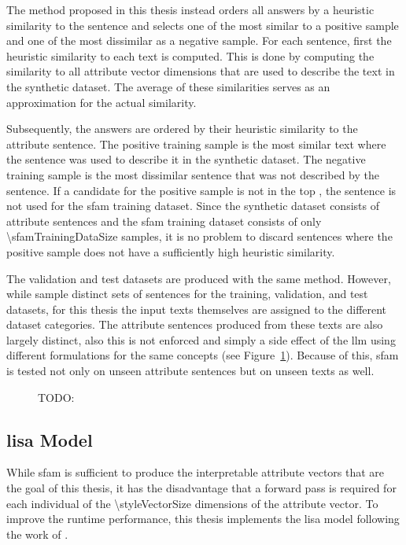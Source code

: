 The method proposed in this thesis instead orders all answers by a heuristic similarity to the sentence and selects one of the most similar to a positive sample and one of the most dissimilar as a negative sample. For each sentence, first the heuristic similarity to each text is computed. This is done by computing the similarity to all attribute vector dimensions that are used to describe the text in the synthetic dataset. The average of these similarities serves as an approximation for the actual similarity.

Subsequently, the answers are ordered by their heuristic similarity to the attribute sentence. The positive training sample is the most similar text where the sentence was used to describe it in the synthetic dataset. The negative training sample is the most dissimilar sentence that was not described by the sentence. If a candidate for the positive sample is not in the top \sfamDataTopPercentText{}, the sentence is not used for the \ac{sfam} training dataset. %
Since the synthetic dataset consists of \numStyleSentencesText{} attribute sentences and the \ac{sfam} training dataset consists of only \num{\sfamTrainingDataSize} samples, it is no problem to discard sentences where the positive sample does not have a sufficiently high heuristic similarity.

The validation and test datasets are produced with the same method. However, while \citet{patelLearningInterpretableStyle2023} sample distinct sets of sentences for the training, validation, and test datasets, for this thesis the input texts themselves are assigned to the different dataset categories. The attribute sentences produced from these texts are also largely distinct, also this is not enforced and simply a side effect of the \ac{llm} using different formulations for the same concepts (see Figure~\ref{fig:sfamDatasetSplit}).
Because of this, \ac{sfam} is tested not only on unseen attribute sentences but on unseen texts as well.

\begin{figure}[ht]
  \begin{center}
    
  \end{center}
  \caption{TODO:}
  \label{fig:sfamDatasetSplit}
\end{figure}


\subsection{\acf{lisa} Model}
\label{sec:experiments:setup:lisa}
While \ac{sfam} is sufficient to produce the interpretable attribute vectors that are the goal of this thesis, it has the disadvantage that a forward pass is required for each individual of the \num{\styleVectorSize} dimensions of the attribute vector. To improve the runtime performance, this thesis implements the \ac{lisa} model following the work of \citet{patelLearningInterpretableStyle2023}.

